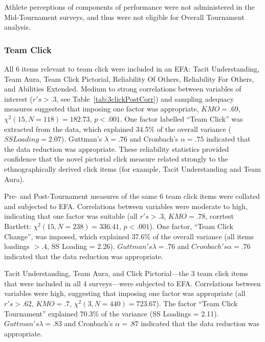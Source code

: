 \begin{CJK}{UTF8}{gbsn}
Athlete perceptions of components of performance were not administered in the Mid-Tournament surveys, and thus were not eligible for Overall Tournament analysis.




\subsubsection{Team Click}

All 6 items relevant to team click were included in an EFA: Tacit Understanding, Team Aura, Team Click Pictorial, Reliability Of Others, Reliability For Others, and Abilities Extended.  Medium to strong correlations between variables of interest ($r's > .3$, see Table~\ref{tab:3clickPostCorr}) and sampling adequacy measures suggested that imposing one factor was appropriate, $KMO =  .69$, $\chi^2(15, N = 118) = 182.73$, $p < .001$.  One factor labelled ``Team Click'' was extracted from the data, which explained 34.5\% of the overall variance ($SS Loading = 2.07$).  Guttman's $\lambda =.76$ and Cronbach's $\alpha = .75$ indicated that the data reduction was appropriate.  These reliability statistics provided confidence that the novel pictorial click measure related strongly to the ethnographically derived click items (for example, Tacit Understanding and Team Aura).


Pre- and Post-Tournament measures of the same 6 team click items were collated and subjected to EFA. Correlations between variables were moderate to high, indicating that one factor was suitable (all $r's > .3$, $KMO = .78$, corrtest Bartlett: $\chi^2(15, N = 238) = 336.41$, $p < .001$).  One factor, ``Team Click Change'', was imposed, which explained 37.6\% of the overall variance (all items loadings $> .4$, SS Loading = 2.26).  $Guttman's \lambda =.76$ and $Cronbach's \alpha = .76$ indicated that the data reduction was appropriate.

Tacit Understanding, Team Aura, and Click Pictorial---the 3 team click items that were included in all 4 surveys---were subjected to EFA.  Correlations between variables were high, suggesting that imposing one factor was appropriate (all $r's > .62$, $KMO = .7$, $\chi^2(3, N = 440) = 723.67$).  The factor ``Team Click Tournament'' explained 70.3\% of the variance (SS Loadings = 2.11).  $Guttman's \lambda =.83$ and Cronbach's $\alpha = .87$ indicated that the data reduction was appropriate.


\end{CJK}
